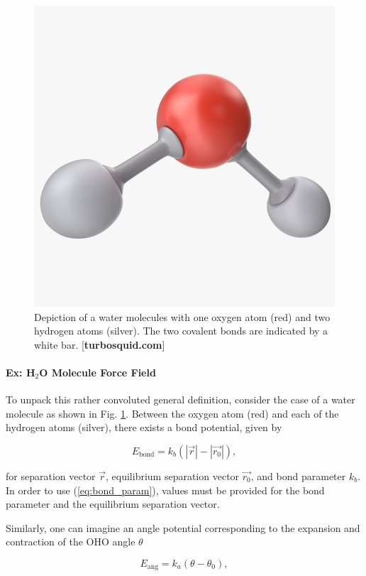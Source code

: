         \begin{figure}
            \centering
            \includegraphics[width=0.4\linewidth]{Figures/System/water-molecule.jpg}
            \caption{Depiction of a water molecules with one oxygen atom (red) and two hydrogen atoms (silver). The two covalent bonds are indicated by a white bar. [\textbf{turbosquid.com}]}
            \label{fig:water_molecule}
        \end{figure}
        
    
            \paragraph{Ex: H$_2$O Molecule Force Field}
    
            To unpack this rather convoluted general definition, consider the case of a water molecule as shown in Fig. \ref{fig:water_molecule}. Between the oxygen atom (red) and each of the hydrogen atoms (silver), there exists a bond potential, given by
            
            \begin{equation}
            \label{eq:bond_param}
                E_\text{bond} = k_b(|\vec{r}|-|\vec{r_0}|),
            \end{equation}
            
            \noindent for separation vector $\vec{r}$, equilibrium separation vector $\vec{r_0}$, and bond parameter $k_b$. In order to use (\ref{eq:bond_param}), values must be provided for the bond parameter and the equilibrium separation vector.
            
            Similarly, one can imagine an angle potential corresponding to the expansion and contraction of the OHO angle $\theta$
            
            \begin{equation}
                E_\text{ang} = k_a(\theta - \theta_0),
            \end{equation}
            
